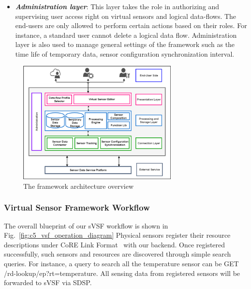 \begin{itemize}
    \item \textbf{\textit{Administration layer}}: This layer takes the role in authorizing and supervising user access right on virtual sensors and logical data-flows. The end-users are only allowed to perform certain actions based on their roles. For instance, a standard user cannot delete a logical data flow. Administration layer is also used to manage general settings of the framework such as the time life of temporary data, sensor configuration synchronization interval.
\end{itemize}

\begin{figure}[h!] 
 \begin{center} 
 \includegraphics[width=0.72\textwidth]{./Part2/Chapter5/figures/vsf_architecture_overview.png} 
    \caption{The framework architecture overview}
     \label{fig:c5_vsf_architecture_overview}
  \end{center} 
\end{figure}

\subsubsection{Virtual Sensor Framework Workflow}
The overall blueprint of our sVSF workflow is shown in Fig.~\ref{fig:c5_vsf_operation_diagram} Physical sensors register their resource descriptions under CoRE Link Format~\cite{Shelby2012} with our backend. Once registered successfully, such sensors and resources are discovered through simple search queries. For instance, a query to search all the temperature sensor can be GET /rd-lookup/ep?rt=temperature. All sensing data from registered sensors will be forwarded to sVSF via SDSP. \\


